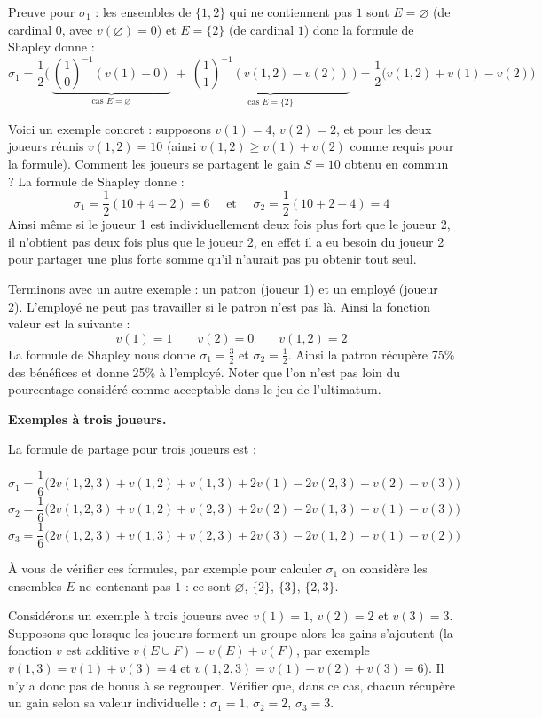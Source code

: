 \documentclass[11pt,class=report,crop=false]{standalone}
\begin{document}
Preuve pour $\sigma_1$ : les ensembles de $\{1,2\}$ qui ne contiennent pas $1$ sont $E=\varnothing$ (de cardinal $0$, avec $v(\varnothing)=0$) et $E = \{2\}$ (de cardinal $1$) donc la formule de Shapley donne :
$$
\sigma_1 
= \frac12\Bigg(
\  
\underbrace{\binom{1}{0}^{-1} \left( v(1) - 0\right)  }_{\text{cas } E=\varnothing} 
\ 
+ \  \underbrace{\binom{1}{1}^{-1} \left(	v(1,2) - v(2) \right)}_{\text{cas } E=\{2\}}  
\ \Bigg) 
= \frac12\big( v(1,2) + v(1) - v(2) \big)$$

Voici un exemple concret : supposons $v(1) = 4$, $v(2)= 2$, et pour les deux joueurs réunis $v(1,2) = 10$ (ainsi $v(1,2) \ge v(1)+v(2)$ comme requis pour la formule).
Comment les joueurs se partagent le gain $S=10$ obtenu en commun ?
La formule de Shapley donne :
$$\sigma_1 = \frac12(10 + 4 -2) = 6 
\quad \text{ et } \quad 
\sigma_2 = \frac12(10 + 2 -4) = 4$$
Ainsi même si le joueur 1 est individuellement deux fois plus fort que le joueur 2, il n'obtient pas deux fois plus que le joueur 2, en effet il a eu besoin du joueur 2 pour partager une plus forte somme qu'il n'aurait pas pu obtenir tout seul.


Terminons avec un autre exemple : un patron (joueur 1) et un employé (joueur 2). L'employé ne peut pas travailler si le patron n'est pas là. Ainsi la fonction valeur est la suivante :
$$v(1) = 1 \qquad v(2) = 0 \qquad v(1,2) = 2$$
La formule de Shapley nous donne $\sigma_1 = \frac32$ et $\sigma_2 = \frac12$. Ainsi la patron récupère 75\% des bénéfices et donne 25\% à l'employé. Noter que l'on n'est pas loin du pourcentage considéré comme acceptable dans le jeu de l'ultimatum.

\bigskip

\textbf{Exemples à trois joueurs.}

La formule de partage pour trois joueurs est :

$$\sigma_1 = \frac16\big(
2v(1,2,3) + v(1,2) + v(1,3) + 2v(1) - 2v(2,3)-v(2)-v(3)
\big)$$
$$\sigma_2 = \frac16\big(
2v(1,2,3) + v(1,2) + v(2,3) + 2v(2) - 2v(1,3)-v(1)-v(3)
\big)$$
$$\sigma_3 = \frac16\big(
2v(1,2,3) + v(1,3) + v(2,3) + 2v(3) - 2v(1,2)-v(1)-v(2)
\big)$$

À vous de vérifier ces formules, par exemple pour calculer $\sigma_1$ on considère les ensembles $E$ ne contenant pas $1$ : ce sont $\varnothing$, $\{2\}$, $\{3\}$, $\{2,3\}$.

\medskip

Considérons un exemple à trois joueurs avec $v(1)=1$, $v(2)=2$ et $v(3)=3$.
Supposons que lorsque les joueurs forment un groupe alors les gains s'ajoutent (la fonction $v$ est additive $v(E \cup F) = v(E)+v(F)$, par exemple $v(1,3) = v(1)+v(3) = 4$ et $v(1,2,3)=v(1)+v(2)+v(3) = 6$). Il n'y a donc pas de bonus à se regrouper. Vérifier que, dans ce cas, chacun récupère un gain selon sa valeur individuelle : $\sigma_1 = 1$, $\sigma_2 = 2$, $\sigma_3 = 3$.
\end{document}
